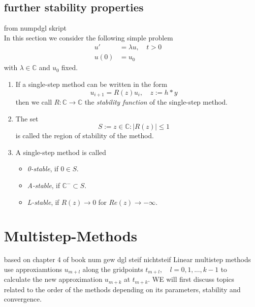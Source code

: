 	\subsection{further stability properties}
		from numpdgl skript \\
		In this section we consider the following simple problem
		\begin{align}
			u' &= \lambda u, \quad t > 0 \\
			u(0) &= u_0
		\end{align}
		with $\lambda \in \mathbb{C}$ and $u_0$ fixed.
		
		\begin{definition}
			\begin{enumerate}
				\item 
				If a single-step method can be written in the form
				\begin{equation}
					u_{i+1} = R(z) u_i, \quad z:= h*y
				\end{equation}
				then we call $R: \mathbb{C} \to \mathbb{C}$ the \emph{stability function} of the single-step method.
				\item 
				The set
				\begin{equation}
					S := {z \in \mathbb{C} : |R(z)| \leq 1}
				\end{equation}
				is called the region of stability of the method.
				\item 
				A single-step method is called
				\begin{itemize}
					\item \emph{0-stable}, if $0 \in S$.
					\item \emph{A-stable}, if $\mathbb{C}^- \subset S$.
					\item \emph{L-stable}, if $R(z) \to 0$ for $Re(z) \to -\infty$.
				\end{itemize}
			\end{enumerate}
		\end{definition}
		
\section{Multistep-Methods}
	based on chapter 4 of book num gew dgl steif nichtsteif \newline
	Linear multistep methods use approxiamtions $u_{m+l}$ along the gridpoints $t_{m+l}, \quad l=0,1,...,k-1$ to calculate the new approximation $u_{m+k}$ at $t_{m+k}$. WE will first discuss topics related to the order of the methods depending on its parameters, stability and convergence.
	
